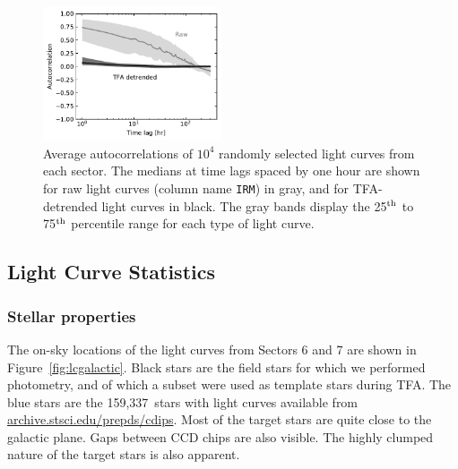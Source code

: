 \documentclass[12pt,twocolumn,tighten]{aastex62}
\newcommand{\numberlcs}{159{,}337\ } %
\newcommand{\stscilink}{\url{archive.stsci.edu/prepds/cdips}}
\begin{document}
\begin{figure}[!t]
	\begin{center}
		\leavevmode
		\includegraphics[width=0.47\textwidth]{avg_acf.pdf}
	\end{center}
	\vspace{-0.5cm}
  \caption{
    Average autocorrelations of $10^4$ randomly selected light curves
    from each sector.
    The medians at time lags spaced by one hour are shown for 
    raw light
    curves (column name \texttt{IRM}) in gray, and for
    TFA-detrended light curves in black.
    The gray bands display the 25$^{\rm th}$ to 75$^{\rm th}$ percentile
    range for each type of light curve.
  \label{fig:avg_acf}
	}
\end{figure}


\subsection{Light Curve Statistics}
\label{subsec:lcstatistics}

\subsubsection{Stellar properties}

The on-sky locations of the light curves from Sectors 6 and 7
are shown in Figure~\ref{fig:lcgalactic}.
Black stars are the field stars for which we performed photometry,
and of which a subset were used as template stars during TFA.
The blue stars are the \numberlcs stars with light curves available
from \stscilink.
Most of the target stars are quite close to the galactic plane.
Gaps between CCD chips are also visible.
The highly clumped nature of the target stars is also apparent.

\end{document}

